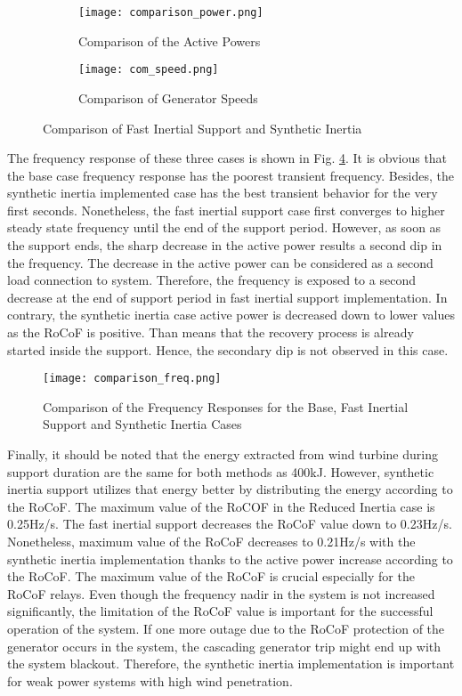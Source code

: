 \begin{figure}[h]
	\centering
	\begin{subfigure}{1\textwidth} %
		\centering
		\texttt{[image: comparison\_power.png]}
		\caption{Comparison of the Active Powers}
		\label{Comp_power}
	\end{subfigure}
	\vspace{0.1em} %
	\begin{subfigure}{1\textwidth} %
		\centering	
		\texttt{[image: com\_speed.png]}
		\caption{Comparison of Generator Speeds}		
		\label{Comp_speed}
	\end{subfigure}
	\caption{Comparison of Fast Inertial Support and Synthetic Inertia}	
\end{figure}
The frequency response of these three cases is shown in Fig. \ref{Comp_freq}. It is obvious that the base case frequency response has the poorest transient frequency. Besides, the synthetic inertia implemented case has the best transient behavior for the very first seconds. Nonetheless, the fast inertial support case first converges to higher steady state frequency until the end of the support period. However, as soon as the support ends, the sharp decrease in the active power results a second dip in the frequency. The decrease in the active power can be considered as a second load connection to system. Therefore, the frequency is exposed to a second decrease at the end of support period in fast inertial support implementation. In contrary, the synthetic inertia case active power is decreased down to lower values as the RoCoF is positive. Than means that the recovery process is already started inside the support. Hence, the secondary dip is not observed in this case. \par
\begin{figure}[h!]
	\centering
	\texttt{[image: comparison\_freq.png]}
	\caption{Comparison of the Frequency Responses for the Base, Fast Inertial Support and Synthetic Inertia Cases}
	\label{Comp_freq}
\end{figure}
\newpage
Finally, it should be noted that the energy extracted from wind turbine during support duration are the same for both methods as 400kJ. However, synthetic inertia support utilizes that energy better by distributing the energy according to the RoCoF. The maximum value of the RoCOF in the Reduced Inertia case is 0.25Hz/s. The fast inertial support decreases the RoCoF value down to 0.23Hz/s. Nonetheless, maximum value of the RoCoF decreases to 0.21Hz/s with the synthetic inertia implementation thanks to the active power increase according to the RoCoF. The maximum value of the RoCoF is crucial especially for the RoCoF relays. Even though the frequency nadir in the system is not increased significantly, the limitation of the RoCoF value is important for the successful operation of the system. If one more outage due to the RoCoF protection of the generator occurs in the system, the cascading generator trip might end up with the system blackout. Therefore, the synthetic inertia implementation is important for weak power systems with high wind penetration.
